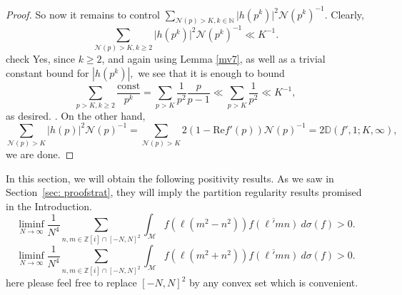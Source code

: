 \documentclass[11pt]{amsart}
\theoremstyle{definition}
\newcommand{\D}{{\mathbb D}}
\newcommand{\N}{{\mathbb N}}
\newcommand{\NN}{{\mathcal N}}
\newcommand{\Z}{{\mathbb Z}}
\begin{document}
\begin{proof}
 So now it remains to control $\sum_{\NN(p)>K, k\in\N}\vert h(p^{k})\vert^{2}\NN(p^{k})^{-1}$. Clearly, 
 $$\sum_{\NN(p)>K, k\geq 2}\vert h(p^{k})\vert^{2}\NN(p^{k})^{-1}\ll K^{-1}.$$
 {\color{red} check} {\color{blue} Yes, since $k\geq 2$, and again using Lemma \ref{mv7}, as well as a trivial constant bound for $|h(p^k)|,$ we see that it is enough to bound
\[
 \sum_{p>K, k \geq 2} \frac{\text{const}}{p^k}=\sum_{p>K} \frac{1}{p^2} \frac{p}{p-1} \ll \sum_{p>K} \frac{1}{p^2} \ll K^{-1},
\]
 as desired.
 }. On the other hand,
 $$\sum_{\NN(p)>K}\vert h(p)\vert^{2}\NN(p)^{-1}=\sum_{\NN(p)>K}2(1-\text{Re}f'(p))\NN(p)^{-1}=2\D(f',1;K,\infty),$$
we are done.
\end{proof}

In this section, we will obtain the following positivity results. As we saw in Section~\ref{sec: proofstrat}, they will imply the partition regularity results promised in the Introduction.
\begin{equation}\label{e14} 
    \liminf_{N \to \infty} \frac{1}{N^4}\sum_{n, m \in \Z[i] \cap [-N,N]^2} \int_{\mathcal{M}} f(\ell(m^2-n^2))\overline{f(\ell'mn)} \ d\sigma(f)>0.
\end{equation}
\begin{equation}\label{e15} 
    \liminf_{N \to \infty} \frac{1}{N^4}\sum_{n, m \in \Z[i] \cap [-N,N]^2} \int_{\mathcal{M}} f(\ell(m^2+n^2))\overline{f(\ell'mn)} \ d\sigma(f)>0.
\end{equation}
{\color{red} here please feel free to replace $[-N,N]^2$ by any convex set which is convenient.
}
\end{document}
